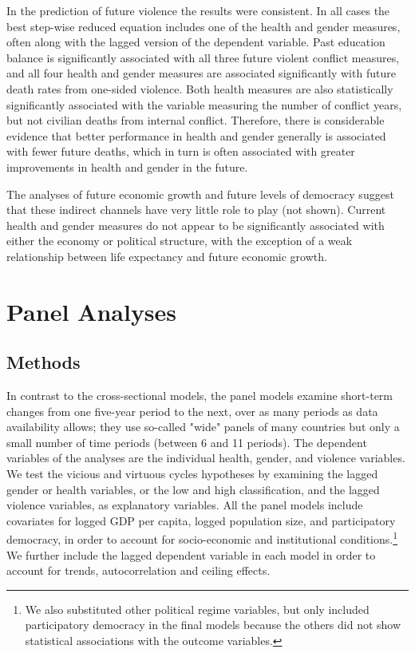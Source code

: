 \documentclass[12pt]{article}
\begin{document}
In the prediction of future violence the results were consistent. In all cases the best step-wise reduced equation includes one of the health and gender measures, often along with the lagged version of the dependent variable. Past education balance is significantly associated with all three future violent conflict measures, and all four health and gender measures are associated significantly with future death rates from one-sided violence. Both health measures are also statistically significantly associated with the variable measuring the number of conflict years, but not civilian deaths from internal conflict. Therefore, there is considerable evidence that better performance in health and gender generally is associated with fewer future deaths, which in turn is often associated with greater improvements in health and gender in the future.

The analyses of future economic growth and future levels of democracy suggest that these indirect channels have very little role to play (not shown). Current health and gender measures do not appear to be significantly associated with either the economy or political structure, with the exception of a weak relationship between life expectancy and future economic growth.

\section{Panel Analyses}

\subsection{Methods}


In contrast to the cross-sectional models, the panel models examine short-term changes from one five-year period to the next, over as many periods as data availability allows; they use so-called "wide" panels of many countries but only a small number of time periods (between 6 and 11 periods).
The dependent variables of the analyses are the individual health, gender, and violence variables.
We test the vicious and virtuous cycles hypotheses by examining the lagged gender or health variables, or the low and high classification, and the lagged violence variables, as explanatory variables.
All the panel models include covariates for logged GDP per capita, logged population size, and participatory democracy, in order to account for socio-economic and institutional conditions.\footnote{We also substituted other political regime variables, but only included participatory democracy in the final models because the others did not show statistical associations with the outcome variables.}
We further include the lagged dependent variable in each model in order to account for trends, autocorrelation and ceiling effects.
\end{document}
